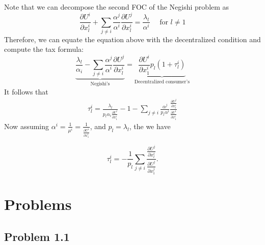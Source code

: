 Note that we can decompose the second FOC of the Negishi problem as 
\[
\frac{\partial U^i}{\partial x^i_l} + \sum_{j \neq i} \frac{\alpha^j}{\alpha^i} \frac{\partial U^j}{\partial x^i_l} = \frac{\lambda_l}{\alpha^i} \quad \text{ for } l \neq 1
\]
Therefore, we can equate the equation above with the decentralized condition and compute the tax formula: 
\[
\underbrace{
\frac{\lambda_l}{\alpha_i} - \sum_{j \neq i} \frac{\alpha^j}{\alpha^i} \frac{\partial U^j}{\partial x^i_l}
}_{\text{Negishi's}} = 
\underbrace{
    \frac{\partial U^i}{\partial x^i_1}  p_l (1 + \tau^i_l)
}_{\text{Decentralized consumer's}}
\]
It follows that 
\begin{align*}
    \tau^i_l = \frac{\lambda_l}{p_l \alpha_i \frac{\partial U^i}{\partial x^i_1}} - 1 
        - \sum_{j \neq i}  \frac{\alpha^j}{p_l \alpha^i}  \frac{\frac{\partial U^j}{\partial x^i_l}}{\frac{\partial U^i}{\partial x^i_1}}
\end{align*}
Now assuming $\alpha^i = \frac{1}{\mu^i} = \frac{1}{\frac{\partial U^i}{\partial x^i_1}}$, and $p_l = \lambda_l$,
the we have
\begin{tcolorbox}
    \[
    \tau^i_l = -  \frac{1}{p_l } \sum_{j \neq i} \frac{\frac{\partial U^j}{\partial x^i_l}}{\frac{\partial U^j}{\partial x^j_1}}.
    \]
\end{tcolorbox}

\section{Problems}
\subsection{Problem 1.1}
